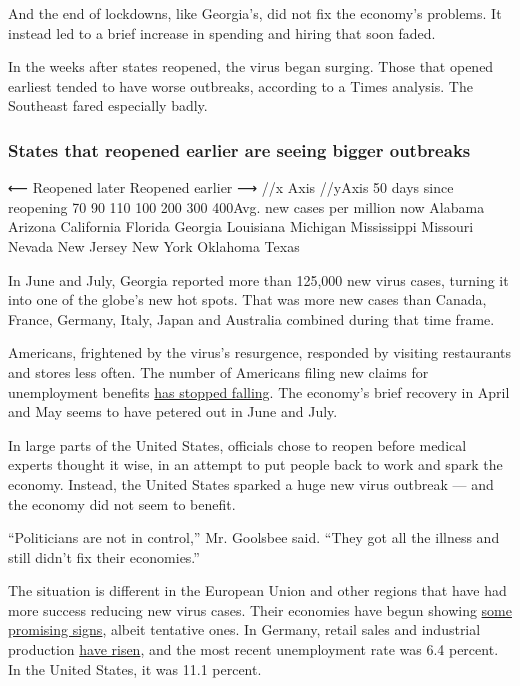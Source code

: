 And the end of lockdowns, like Georgia's, did not fix the economy's
problems. It instead led to a brief increase in spending and hiring that
soon faded.

In the weeks after states reopened, the virus began surging. Those that
opened earliest tended to have worse outbreaks, according to a Times
analysis. The Southeast fared especially badly.

\hypertarget{states-that-reopened-earlier-are-seeing-bigger-outbreaks}{%
\subsubsection{States that reopened earlier are seeing bigger
outbreaks}\label{states-that-reopened-earlier-are-seeing-bigger-outbreaks}}

⟵ Reopened later Reopened earlier ⟶ //x Axis //yAxis 50 days since
reopening 70 90 110 100 200 300 400Avg. new cases per million now
Alabama Arizona California Florida Georgia Louisiana Michigan
Mississippi Missouri Nevada New Jersey New York Oklahoma Texas

In June and July, Georgia reported more than 125,000 new virus cases,
turning it into one of the globe's new hot spots. That was more new
cases than Canada, France, Germany, Italy, Japan and Australia combined
during that time frame.

Americans, frightened by the virus's resurgence, responded by visiting
restaurants and stores less often. The number of Americans filing new
claims for unemployment benefits
\href{https://www.nytimes.com/2020/07/23/business/economy/unemployment-economy-coronavirus.html}{has
stopped falling}. The economy's brief recovery in April and May seems to
have petered out in June and July.

In large parts of the United States, officials chose to reopen before
medical experts thought it wise, in an attempt to put people back to
work and spark the economy. Instead, the United States sparked a huge
new virus outbreak --- and the economy did not seem to benefit.

``Politicians are not in control,'' Mr. Goolsbee said. ``They got all
the illness and still didn't fix their economies.''

The situation is different in the European Union and other regions that
have had more success reducing new virus cases. Their economies have
begun showing
\href{https://www.nytimes.com/2020/07/31/business/europe-economy-recovery-coronavirus.html}{some
promising signs}, albeit tentative ones. In Germany, retail sales and
industrial production
\href{https://www.wsj.com/articles/germanys-economy-suffers-biggest-contraction-on-record-but-green-shoots-emerge-11596101866}{have
risen}, and the most recent unemployment rate was 6.4 percent. In the
United States, it was 11.1 percent.

